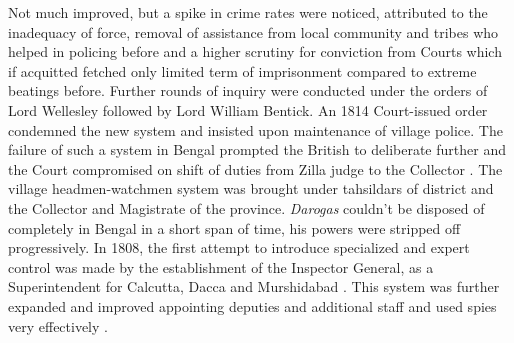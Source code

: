 \documentclass[twocolumn,a4paper]{article}
\begin{document}
Not much improved\cite[p. 9]{india1913history}, but a spike in
crime rates were noticed, attributed to the inadequacy of force,
removal of assistance from local community and tribes who helped
in policing before and a higher scrutiny for conviction from
Courts which if acquitted fetched only limited term of
imprisonment compared to extreme beatings before. Further rounds
of inquiry were conducted under the orders of Lord Wellesley
followed by Lord William Bentick. An 1814 Court-issued order
condemned the new system and insisted upon maintenance of
village police. The failure of such a system in Bengal prompted
the British to deliberate further and the Court compromised on
shift of duties from Zilla judge to the Collector \cite[p.
11]{india1913history}. The village headmen-watchmen system was
brought under tahsildars of district and the Collector and
Magistrate of the province.  \emph{Darogas} couldn't be disposed
of completely in Bengal in a short span of time, his powers were
stripped off progressively.  In 1808, the first attempt to
introduce specialized and expert control was made by the
establishment of the Inspector General, as a Superintendent for
Calcutta, Dacca and Murshidabad \cite[p.  12]{india1913history}.
This system was further expanded and improved appointing
deputies and additional staff and used spies very effectively
\cite[p. 12]{india1913history}.




\printbibliography 
\end{document}
